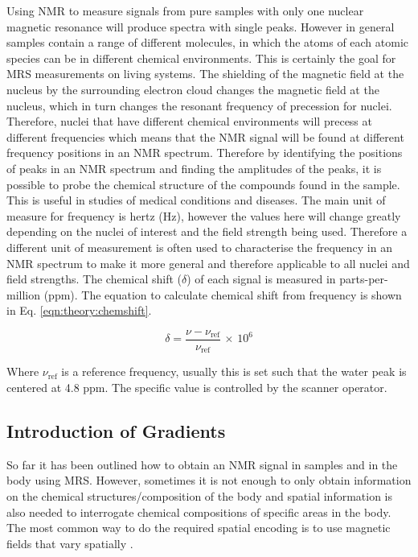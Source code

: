 Using \ac{NMR} to measure signals from pure samples with only one nuclear magnetic resonance will produce spectra with single peaks. However in general samples contain a range of different molecules, in which the atoms of each atomic species can be in different chemical environments. This is certainly the goal for \ac{MRS} measurements on living systems. The shielding of the magnetic field at the nucleus by the surrounding electron cloud changes the magnetic field at the nucleus, which in turn changes the resonant frequency of precession for nuclei. Therefore, nuclei that have different chemical environments will precess at different frequencies which means that the \ac{NMR} signal will be found at different frequency positions in an \ac{NMR} spectrum. Therefore by identifying the positions of peaks in an \ac{NMR} spectrum and finding the amplitudes of the peaks, it is possible to probe the chemical structure of the compounds found in the sample. This is useful in studies of medical conditions and diseases. The main unit of measure for frequency is hertz (Hz), however the values here will change greatly depending on the nuclei of interest and the field strength being used. Therefore a different unit of measurement is often used to characterise the frequency in an \ac{NMR} spectrum to make it more general and therefore applicable to all nuclei and field strengths. The chemical shift ($\delta$) of each signal is measured in parts-per-million (ppm). The equation to calculate chemical shift from frequency is shown in Eq. \ref{eqn:theory:chemshift}.

\begin{equation}
    \delta = \frac{\nu - \nu_{\textrm{ref}}}{\nu_\textrm{ref}} \, \times \, 10^6
    \label{eqn:theory:chemshift}
\end{equation}

Where $\nu_{\textrm{ref}}$ is a reference frequency, usually this is set such that the water peak is centered at 4.8 ppm. The specific value is controlled by the scanner operator.  

\subsection{Introduction of Gradients}

So far it has been outlined how to obtain an \ac{NMR} signal in samples and in the body using MRS. However, sometimes it is not enough to only obtain information on the chemical structures/composition of the body and spatial information is also needed to interrogate chemical compositions of specific areas in the body. The most common way to do the required spatial encoding is to use magnetic fields that vary spatially \cite{Haacke2014MagneticDesign}. 

